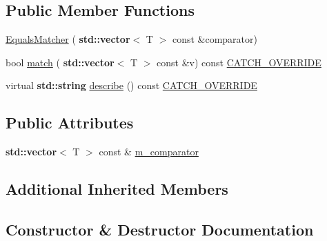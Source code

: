 \subsection*{Public Member Functions}
\begin{DoxyCompactItemize}
\item 
\hyperlink{struct_catch_1_1_matchers_1_1_vector_1_1_equals_matcher_a3846c47780d1991dcfe87aefded98008}{Equals\+Matcher} (\textbf{ std\+::vector}$<$ T $>$ const \&comparator)
\item 
bool \hyperlink{struct_catch_1_1_matchers_1_1_vector_1_1_equals_matcher_aca444c319d1b4c6f538faf9c4735da04}{match} (\textbf{ std\+::vector}$<$ T $>$ const \&v) const \hyperlink{catch_8hpp_a8ecdce4d3f57835f707915ae831eb847}{C\+A\+T\+C\+H\+\_\+\+O\+V\+E\+R\+R\+I\+DE}
\item 
virtual \textbf{ std\+::string} \hyperlink{struct_catch_1_1_matchers_1_1_vector_1_1_equals_matcher_aca79ade26f4a75b2a57005067e086e35}{describe} () const \hyperlink{catch_8hpp_a8ecdce4d3f57835f707915ae831eb847}{C\+A\+T\+C\+H\+\_\+\+O\+V\+E\+R\+R\+I\+DE}
\end{DoxyCompactItemize}
\subsection*{Public Attributes}
\begin{DoxyCompactItemize}
\item 
\textbf{ std\+::vector}$<$ T $>$ const  \& \hyperlink{struct_catch_1_1_matchers_1_1_vector_1_1_equals_matcher_a56f7aa6f110a12b1b9aeb0cabbc9d755}{m\+\_\+comparator}
\end{DoxyCompactItemize}
\subsection*{Additional Inherited Members}


\subsection{Constructor \& Destructor Documentation}
\mbox{\label{struct_catch_1_1_matchers_1_1_vector_1_1_equals_matcher_a3846c47780d1991dcfe87aefded98008}} 
